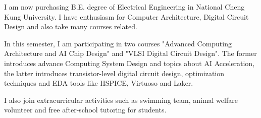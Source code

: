 

\begin{cvparagraph}

    I am now purchasing B.E. degree of Electrical Engineering in National Cheng Kung University. I have enthusiasm for Computer Architecture, Digital Circuit Design and also take many courses related.

    In this semester, I am participating in two courses "Advanced Computing Architecture and AI Chip Design" and "VLSI Digital Circuit Design". The former introduces advance Computing System Design and topics about AI Acceleration, the latter introduces transistor-level digital circuit design, optimization techniques and EDA tools like HSPICE, Virtuoso and Laker.

    I also join extracurricular activities such as swimming team, animal welfare volunteer and free after-school tutoring for students.
\end{cvparagraph}

